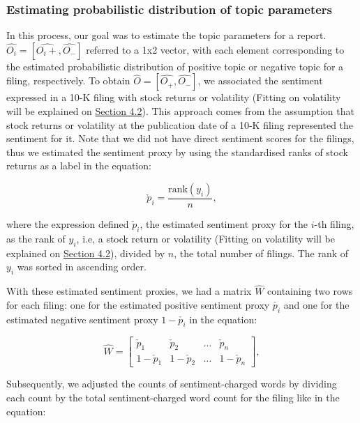 \documentclass[logo,bsc,singlespacing,parskip]{infthesis}
\begin{document}
\subsubsection{Estimating probabilistic distribution of topic parameters}

In this process, our goal was to estimate the topic parameters for a report. $\hat{O_i} =[\hat{O_i+},\hat{O_-}]$ referred to a 1x2 vector, with each element corresponding to the estimated probabilistic distribution of positive topic or negative topic for a filing, respectively. To obtain $\hat{O} =[\hat{O_+},\hat{O_-}]$, we associated the sentiment expressed in a 10-K filing with stock returns or volatility (Fitting on volatility will be explained on \hyperref[sec:volatility_label]{Section 4.2}). This approach comes from the assumption that stock returns or volatility at the publication date of a 10-K filing represented the sentiment for it. Note that we did not have direct sentiment scores for the filings, thus we estimated the sentiment proxy by using the standardised ranks of stock returns as a label in the equation:

\begin{equation} \label{4.5}
\check{p}_i = \frac{\text{rank}(y_i)}{n},
\end{equation}

where the expression defined $\check{p}_i$, the estimated sentiment proxy for the $i$-th filing, as the rank of $y_i$, i.e, a stock return or volatility (Fitting on volatility will be explained on \hyperref[sec:volatility_label]{Section 4.2}), divided by $n$, the total number of filings. The rank of $y_i$ was sorted in ascending order. 

With these estimated sentiment proxies, we had a matrix $\hat{W}$ containing two rows for each filing: one for the estimated positive sentiment proxy $\check{p_i}$ and one for the estimated negative sentiment proxy $1-\check{p_i}$ in the equation:

\begin{equation} \label{4.6}
\hat{W} = \begin{bmatrix}    \check{p}_1 & \check{p}_2 & \dots & \check{p}_n \\    1-\check{p}_1 & 1-\check{p}_2 & \dots & 1-\check{p}_n\end{bmatrix},
\end{equation}

Subsequently, we adjusted the counts of sentiment-charged words by dividing each count by the total sentiment-charged word count for the filing like in the equation:
\end{document}
